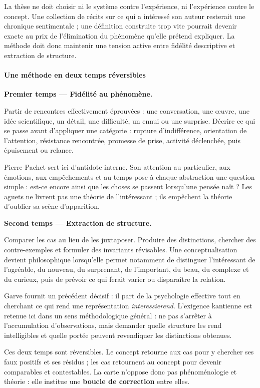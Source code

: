 \documentclass[10pt,a4paper]{article}
\begin{document}
La thèse ne doit choisir ni le système contre l'expérience, ni l'expérience contre le concept. Une collection de récits sur ce qui a intéressé son auteur resterait une chronique sentimentale ; une définition construite trop vite pourrait devenir exacte au prix de l'élimination du phénomène qu'elle prétend expliquer. La méthode doit donc maintenir une tension active entre fidélité descriptive et extraction de structure.

\paragraph{Une méthode en deux temps réversibles}
\textbf{Premier temps — Fidélité au phénomène.}

Partir de rencontres effectivement éprouvées : une conversation, une œuvre, une idée scientifique, un détail, une difficulté, un ennui ou une surprise. Décrire ce qui se passe avant d'appliquer une catégorie : rupture d'indifférence, orientation de l'attention, résistance rencontrée, promesse de prise, activité déclenchée, puis épuisement ou relance.

Pierre Pachet sert ici d'antidote interne. Son attention au particulier, aux émotions, aux empêchements et au temps pose à chaque abstraction une question simple : est-ce encore ainsi que les choses se passent lorsqu'une pensée naît ? Les aguets ne livrent pas une théorie de l'intéressant ; ils empêchent la théorie d'oublier sa scène d'apparition.

\textbf{Second temps — Extraction de structure.}

Comparer les cas au lieu de les juxtaposer. Produire des distinctions, chercher des contre-exemples et formuler des invariants révisables. Une conceptualisation devient philosophique lorsqu'elle permet notamment de distinguer l'intéressant de l'agréable, du nouveau, du surprenant, de l'important, du beau, du complexe et du curieux, puis de prévoir ce qui ferait varier ou disparaître la relation.

Garve fournit un précédent décisif : il part de la psychologie effective tout en cherchant ce qui rend une représentation \emph{interessierend}. L'exigence kantienne est retenue ici dans un sens méthodologique général : ne pas s'arrêter à l'accumulation d'observations, mais demander quelle structure les rend intelligibles et quelle portée peuvent revendiquer les distinctions obtenues.

Ces deux temps sont réversibles. Le concept retourne aux cas pour y chercher ses faux positifs et ses résidus ; les cas retournent au concept pour devenir comparables et contestables. La carte n'oppose donc pas phénoménologie et théorie : elle institue une \textbf{boucle de correction} entre elles.
\end{document}
